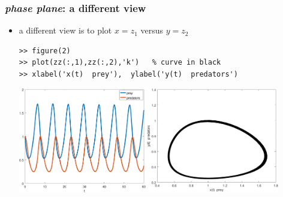 \documentclass[dvipsnames,colorlinks]{beamer}
\begin{document}
\begin{frame}[fragile]
\frametitle{\emph{phase plane}: a different view}

\begin{itemize}
\item a different view is to plot $x=z_1$ versus $y=z_2$

\begin{Verbatim}[fontsize=\small]
>> figure(2)
>> plot(zz(:,1),zz(:,2),'k')   % curve in black
>> xlabel('x(t)  prey'),  ylabel('y(t)  predators')
\end{Verbatim}

\bigskip
\mbox{\includegraphics[width=0.44\textwidth]{figs/lotka-time}\quad \includegraphics[width=0.46\textwidth]{figs/lotka-phase}}
\end{itemize}
\end{frame}
\end{document}
